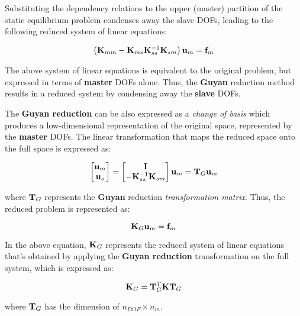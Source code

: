 Substituting the dependency relations to the upper (master) partition of the static
equilibrium problem condenses away the slave DOFs, leading to the following reduced
system of linear equations:

\begin{equation}
    \left(\mathbf{K}_{mm} - \mathbf{K}_{ms} \mathbf{K}_{ss}^{-1} \mathbf{K}_{sm} \right)
    \mathbf{u}_m = \mathbf{f}_m
\end{equation}

The above system of linear equations is equivalent to the original problem, but expressed
in terms of \textbf{master} DOFs alone. Thus, the \textbf{Guyan} reduction method
results in a reduced system by condensing away the \textbf{slave} DOFs.

The \textbf{Guyan reduction} can be also expressed as a \textit{change of basis} which
produces a low-dimensional representation of the original space, represented by the
\textbf{master} DOFs. The linear transformation that maps the reduced space onto
the full space is expressed as:

\begin{equation}
    \begin{bmatrix}
        \mathbf{u}_m \\
        \mathbf{u}_s
    \end{bmatrix} =
    \begin{bmatrix}
        \mathbf{I} \\
        -\mathbf{K}_{ss}^{-1} \mathbf{K}_{sm}
    \end{bmatrix}
    \mathbf{u}_m = \mathbf{T}_G \mathbf{u}_m
\end{equation}

where $ \mathbf{T}_G $ represents the \textbf{Guyan} reduction \textit{transformation matrix}.
Thus, the reduced problem is represented as:

\begin{equation}
    \mathbf{K}_G \mathbf{u}_m = \mathbf{f}_m
\end{equation}

In the above equation, $ \mathbf{K}_G $ represents the reduced system of linear equations
that's obtained by applying the \textbf{Guyan reduction} transformation on the
full system, which is expressed as:

\begin{equation}
    \mathbf{K}_G = \mathbf{T}_G^T \mathbf{K} \mathbf{T}_G
\end{equation}

where $ \mathbf{T}_G $ has the dimension of $ n_{DOF} \times n_m $.


